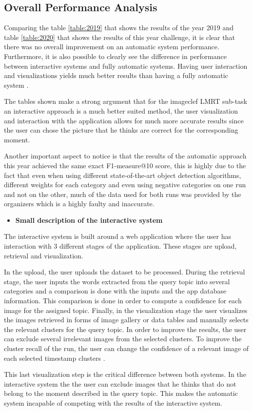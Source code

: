 \subsection{Overall Performance Analysis}

Comparing the table \ref{table:2019} that shows the results of the year 2019 and table \ref{table:2020} that shows the results of this year challenge, it is clear that there was no overall improvement on an automatic system performance. Furthermore, it is also possible to clearly see the difference in performance between interactive systems and fully automatic systems. Having user interaction and visualizations yields much better results than having a fully automatic system \cite{Ribeiro2020}.


The tables shown make a strong argument that for the imageclef LMRT sub-task an interactive approach is a much better suited method, the user visualization and interaction with the application allows for much more accurate results since the user can chose the picture that he thinks are correct for the corresponding moment.

Another important aspect to notice is that the results of the automatic approach this year achieved the same exact F1-measure@10 score, this is highly due to the fact that even when using different state-of-the-art object detection algorithms, different weights for each category and even using negative categories on one run and not on the other, much of the data used for both runs was provided by the organizers which is a highly faulty and inaccurate.




\begin{itemize}
  \item \textbf{Small description of the interactive system}
\end{itemize}

The interactive system is built around a web application where the user has interaction with 3 different stages of the application. These stages are upload, retrieval and visualization. 

In the upload, the user uploads the dataset to be processed. During the retrieval stage, the user inputs the words extracted from the query topic into several categories and a comparison is done with the inputs and the app database information. This comparison is done in order to compute a confidence for each image for the assigned topic. Finally, in the visualization stage the user visualizes the images retrieved in forms of image gallery or data tables and manually selects the relevant clusters for the query topic. In order to improve the results, the user can exclude several irrelevant images from the selected clusters. To improve the cluster recall of the run, the user can change the confidence of a relevant image of each selected timestamp clusters \cite{Ribeiro2020}.

This last visualization step is the critical difference between both systems. In the interactive system the the user can exclude images that he thinks that do not belong to the moment described in the query topic. This makes the automatic system incapable of competing with the results of the interactive system.
